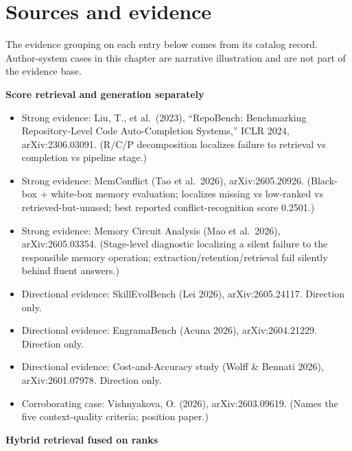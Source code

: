 \section*{Sources and evidence}

The evidence grouping on each entry below comes from its catalog record. Author-system cases in this chapter are narrative illustration and are not part of the evidence base.

\textbf{Score retrieval and generation separately}

\begin{itemize}
\tightlist
\item
  Strong evidence: Liu, T., et al.~(2023), ``RepoBench: Benchmarking Repository-Level Code Auto-Completion Systems,'' ICLR 2024, arXiv:2306.03091. (R/C/P decomposition localizes failure to retrieval vs completion vs pipeline stage.)
\item
  Strong evidence: MemConflict (Tao et al.~2026), arXiv:2605.20926. (Black-box + white-box memory evaluation; localizes missing vs low-ranked vs retrieved-but-unused; best reported conflict-recognition score 0.2501.)
\item
  Strong evidence: Memory Circuit Analysis (Mao et al.~2026), arXiv:2605.03354. (Stage-level diagnostic localizing a silent failure to the responsible memory operation; extraction/retention/retrieval fail silently behind fluent answers.)
\item
  Directional evidence: SkillEvolBench (Lei 2026), arXiv:2605.24117. Direction only.
\item
  Directional evidence: EngramaBench (Acuna 2026), arXiv:2604.21229. Direction only.
\item
  Directional evidence: Cost-and-Accuracy study (Wolff \& Bennati 2026), arXiv:2601.07978. Direction only.
\item
  Corroborating case: Vishnyakova, O. (2026), arXiv:2603.09619. (Names the five context-quality criteria; position paper.)
\end{itemize}

\textbf{Hybrid retrieval fused on ranks}


